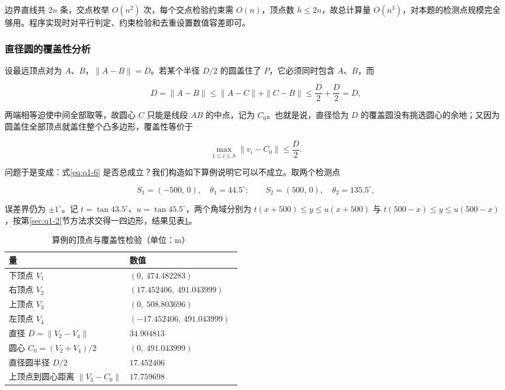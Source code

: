 边界直线共 $2n$ 条，交点枚举 $O(n^2)$ 次，每个交点检验约束需 $O(n)$，顶点数 $h\le 2n$，故总计算量 $O(n^3)$，对本题的检测点规模完全够用。程序实现时对平行判定、约束检验和去重设置数值容差即可。

\subsubsection{直径圆的覆盖性分析}\label{sec:q1-3}
设最远顶点对为 $A$、$B$，$\|A-B\|=D$。若某个半径 $D/2$ 的圆盖住了 $P$，它必须同时包含 $A$、$B$，而

\[
D=\|A-B\|\le\|A-C\|+\|C-B\|\le\frac D2+\frac D2=D,
\]

两端相等迫使中间全部取等，故圆心 $C$ 只能是线段 $AB$ 的中点，记为 $C_0$。也就是说，直径恰为 $D$ 的覆盖圆没有挑选圆心的余地；又因为圆盖住全部顶点就盖住整个凸多边形，覆盖性等价于

\begin{equation}\label{eq:q1-6}
\max_{1\le i\le h}\|v_i-C_0\|\le\frac D2 .
\end{equation}

问题于是变成：式\eqref{eq:q1-6} 是否总成立？我们构造如下算例说明它可以不成立。取两个检测点

\[
S_1=(-500,\,0),\quad\theta_1=44.5^\circ;\qquad
S_2=(500,\,0),\quad\theta_2=135.5^\circ,
\]

误差界仍为 $\pm 1^\circ$。记 $t=\tan 43.5^\circ$、$u=\tan 45.5^\circ$，两个角域分别为 $t(x+500)\le y\le u(x+500)$ 与 $t(500-x)\le y\le u(500-x)$，按第\ref{sec:q1-2}节方法求交得一四边形，结果见表\ref{tab:q1-counterexample}。

\begin{table}[htbp]
\centering
\caption{算例的顶点与覆盖性检验（单位：m）}\label{tab:q1-counterexample}

\begin{center}
\renewcommand{\arraystretch}{1.3}
\begin{tabularx}{0.98\linewidth}{>{\raggedright\arraybackslash}p{0.52\linewidth}X}
\toprule
\textbf{量} & \textbf{数值} \\
\midrule
下顶点 $V_1$ & $(0,\ 474.482283)$ \\
右顶点 $V_2$ & $(17.452406,\ 491.043999)$ \\
上顶点 $V_3$ & $(0,\ 508.803696)$ \\
左顶点 $V_4$ & $(-17.452406,\ 491.043999)$ \\
直径 $D=\|V_2-V_4\|$ & $34.904813$ \\
圆心 $C_0=(V_2+V_4)/2$ & $(0,\ 491.043999)$ \\
直径圆半径 $D/2$ & $17.452406$ \\
上顶点到圆心距离 $\|V_3-C_0\|$ & $\boldsymbol{17.759698}$ \\
\bottomrule
\end{tabularx}
\end{center}
\end{table}

